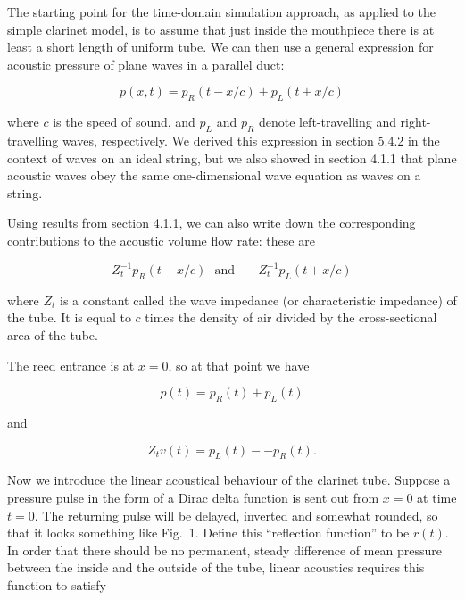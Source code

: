   The starting point for the time-domain simulation approach, as applied to the 
  simple clarinet model, is to assume that just inside the mouthpiece there is 
  at least a short length of uniform tube. We can then use a general expression 
  for acoustic pressure of plane waves in a parallel duct: 

  \begin{equation*}p(x,t) = p_R(t-x/c) + p_L(t+x/c) \tag{1}\end{equation*} 

  \noindent{}where $c$ is the speed of sound, and $p_L$ and $p_R$ denote 
  left-travelling and right-travelling waves, respectively. We derived this 
  expression in section 5.4.2 in the context of waves on an ideal string, but 
  we also showed in section 4.1.1 that plane acoustic waves obey the same 
  one-dimensional wave equation as waves on a string. 

  Using results from section 4.1.1, we can also write down the corresponding 
  contributions to the acoustic volume flow rate: these are 

  \begin{equation*}Z_t^{-1}p_R(t-x/c) \mathrm{~~~and~~~} -Z_t^{-1}p_L(t+x/c) 
  \tag{2}\end{equation*} 

  \noindent{}where $Z_t$ is a constant called the wave impedance (or 
  characteristic impedance) of the tube. It is equal to $c$ times the density 
  of air divided by the cross-sectional area of the tube. 

  The reed entrance is at $x=0$, so at that point we have 

  \begin{equation*}p(t)=p_R(t) + p_L(t) \tag{3}\end{equation*} 

  \noindent{}and 

  \begin{equation*}Z_t v(t)=p_L(t) -- p_R(t) . \tag{4}\end{equation*} 

  Now we introduce the linear acoustical behaviour of the clarinet tube. 
  Suppose a pressure pulse in the form of a Dirac delta function is sent out 
  from $x=0$ at time $t=0$. The returning pulse will be delayed, inverted and 
  somewhat rounded, so that it looks something like Fig.\ 1. Define this 
  ``reflection function'' to be $r(t)$. In order that there should be no 
  permanent, steady difference of mean pressure between the inside and the 
  outside of the tube, linear acoustics requires this function to satisfy 

